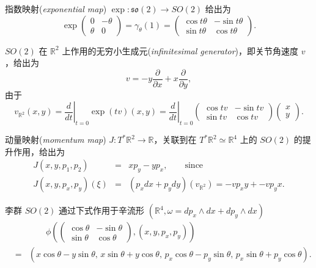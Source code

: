 \documentclass[11pt,fontset=founder]{ctexart}
\begin{document}
指数映射(\emph{exponential map}) $\exp :\mathfrak{so}(2)\rightarrow SO(2)$ 给出为
\begin{equation*}
\exp \left(
\begin{array}{cc}
0 & -\theta \\
\theta & 0%
\end{array}
\right) =\gamma _{\theta }(1)=\left(
\begin{array}{cc}
\cos t\theta & -\sin t\theta \\
\sin t\theta & \cos t\theta%
\end{array}
\right).
\end{equation*}

$SO(2)$ 在 $\mathbb{R}^{2}$ 上作用的无穷小生成元(\emph{infinitesimal generator})，即关节角速度 $v$，给出为
\begin{equation*}
v=-y\frac{\partial }{\partial x}+x\frac{\partial }{\partial y},
\end{equation*}
由于
\begin{equation*}
v_{\mathbb{R}^{2}}\left( x,y\right) =\left. \frac{d}{dt}\right\vert
_{t=0}\exp (tv)\left( x,y\right) =\left. \frac{d}{dt}\right\vert
_{t=0}\left(
\begin{array}{cc}
\cos tv & -\sin tv \\
\sin tv & \cos tv%
\end{array}%
\right) \left(
\begin{array}{c}
x \\
y%
\end{array}%
\right) .
\end{equation*}

动量映射(\emph{momentum map}) $J:T^{\ast }\mathbb{R}^{2}\rightarrow \mathbb{R}$，关联到在 $T^{\ast }\mathbb{R}^{2}\simeq \mathbb{R}^{4}$ 上的 $SO(2)$ 的提升作用，给出为
\begin{eqnarray*}
J\left( x,y,p_{1},p_{2}\right) &=&xp_{y}-yp_{x},\qquad \text{since} \\
J\left( x,y,p_{x},p_{y}\right) (\xi ) &=&(p_{x}dx+p_{y}dy)(v_{\mathbb{R}%
^{2}})=-vp_{x}y+-vp_{y}x.
\end{eqnarray*}

李群 $SO(2)$ 通过下式作用于辛流形 $(\mathbb{R}%
^{4},\omega =dp_{x}\wedge dx+dp_{y}\wedge dx)$  
\begin{eqnarray*}
&&\qquad\phi \left( \left(
\begin{array}{cc}
\cos \theta & -\sin \theta \\
\sin \theta & \cos \theta%
\end{array}
\right) ,\left( x,y,p_{x},p_{y}\right) \right) \\
&=&\left( x\cos \theta -y\sin \theta ,\,x\sin \theta +y\cos \theta
,\,p_{x}\cos \theta -p_{y}\sin \theta ,\,p_{x}\sin \theta +p_{y}\cos \theta
\right) .
\end{eqnarray*}%
\bigbreak
\end{document}
